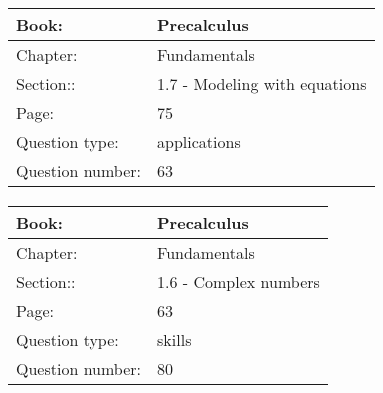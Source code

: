 \documentclass{article}
\begin{document}
            \paragraph{}
            \begin{tabularx}{1\textwidth}{
                    p{}
                    p{}
                }
                \toprule
                Book: & Precalculus
                \\
                \midrule
                Chapter: & Fundamentals
                \\
                \midrule
                Section:: & 1.7 - Modeling with equations
                \\
                \midrule
                Page: & 75
                \\
                \midrule
                Question type: & applications
                \\
                \midrule
                Question number: & 63
                \\
                \bottomrule
            \end{tabularx}
            
            \paragraph{}
            \begin{tabularx}{1\textwidth}{
                    p{}
                    p{}
                }
                \toprule
                Book: & Precalculus
                \\
                \midrule
                Chapter: & Fundamentals
                \\
                \midrule
                Section:: & 1.6 - Complex numbers
                \\
                \midrule
                Page: & 63
                \\
                \midrule
                Question type: & skills
                \\
                \midrule
                Question number: & 80
                \\
                \bottomrule
            \end{tabularx}
            
\end{document}
